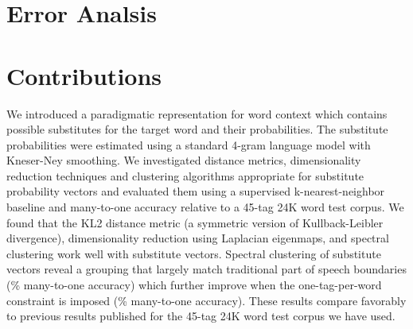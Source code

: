 \documentclass[11pt]{article}
\begin{document}
\section{Error Analsis}

\section{Contributions}
\label{sec:contrib}

We introduced a paradigmatic representation for word context which
contains possible substitutes for the target word and their
probabilities.  The substitute probabilities were estimated using a
standard 4-gram language model with Kneser-Ney smoothing.  We
investigated distance metrics, dimensionality reduction techniques and
clustering algorithms appropriate for substitute probability vectors
and evaluated them using a supervised k-nearest-neighbor baseline and
many-to-one accuracy relative to a 45-tag 24K word test corpus.  We
found that the KL2 distance metric (a symmetric version of
Kullback-Leibler divergence), dimensionality reduction using Laplacian
eigenmaps, and spectral clustering work well with substitute vectors.
Spectral clustering of substitute vectors reveal a grouping that
largely match traditional part of speech boundaries (\spectralResult\%
many-to-one accuracy) which further improve when the one-tag-per-word
constraint is imposed (\collapseResult\% many-to-one accuracy).  These
results compare favorably to previous results published for the 45-tag
24K word test corpus we have used.  



\end{document}
